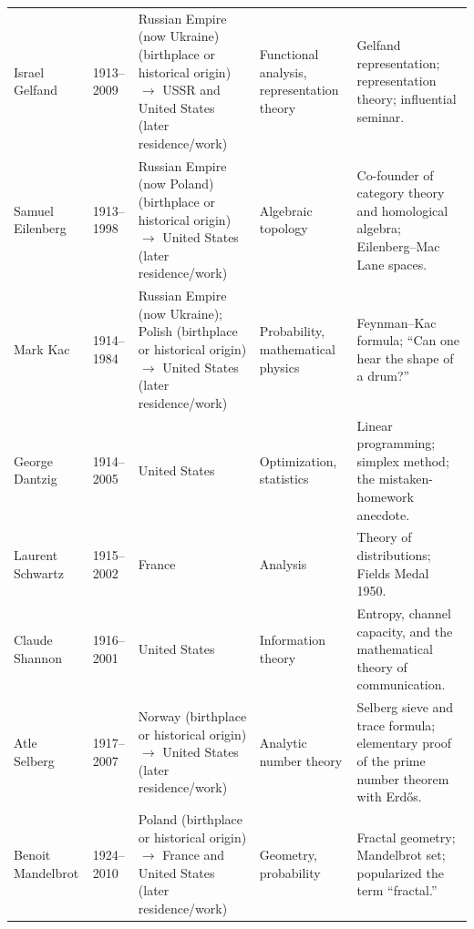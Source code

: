 {\begin{longtable}{@{}L{0.145\textwidth}L{0.09\textwidth}L{0.225\textwidth}L{0.14\textwidth}L{0.30\textwidth}@{}}
        Israel Gelfand
        & 1913--2009
        & Russian Empire (now Ukraine) (birthplace or historical origin) \(\to\) USSR and United States (later residence/work)
        & Functional analysis, representation theory
        & Gelfand representation; representation theory; influential seminar. \\

        Samuel Eilenberg
        & 1913--1998
        & Russian Empire (now Poland) (birthplace or historical origin) \(\to\) United States (later residence/work)
        & Algebraic topology
        & Co-founder of category theory and homological algebra;
          Eilenberg--Mac Lane spaces. \\

        Mark Kac
        & 1914--1984
        & Russian Empire (now Ukraine); Polish (birthplace or historical origin) \(\to\) United States (later residence/work)
        & Probability, mathematical physics
        & Feynman--Kac formula; ``Can one hear the shape of a drum?'' \\

        George Dantzig
        & 1914--2005
        & United States
        & Optimization, statistics
        & Linear programming; simplex method; the mistaken-homework anecdote. \\

        Laurent Schwartz
        & 1915--2002
        & France
        & Analysis
        & Theory of distributions; Fields Medal 1950. \\

        Claude Shannon
        & 1916--2001
        & United States
        & Information theory
        & Entropy, channel capacity, and the mathematical theory of
          communication. \\

        Atle Selberg
        & 1917--2007
        & Norway (birthplace or historical origin) \(\to\) United States (later residence/work)
        & Analytic number theory
        & Selberg sieve and trace formula; elementary proof of the prime number
          theorem with Erd\H{o}s. \\

        Benoit Mandelbrot
        & 1924--2010
        & Poland (birthplace or historical origin) \(\to\) France and United States (later residence/work)
        & Geometry, probability
        & Fractal geometry; Mandelbrot set; popularized the term ``fractal.'' \\


\end{longtable}}
